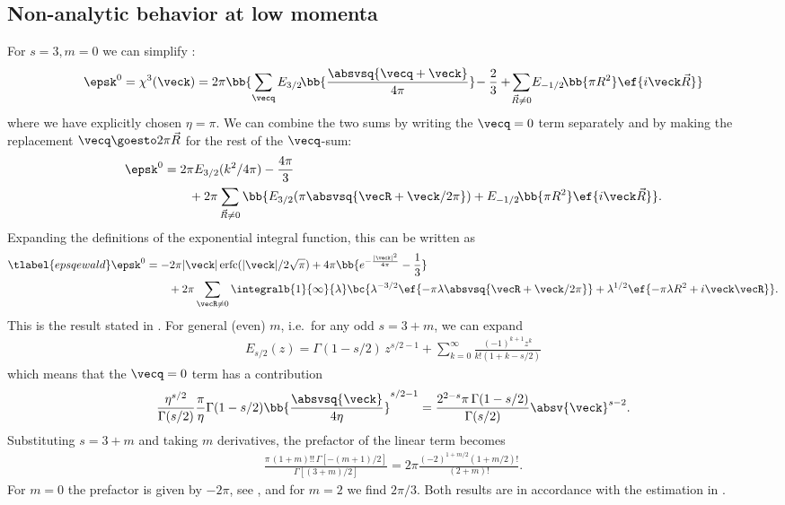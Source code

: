\subsection{Non-analytic behavior at low momenta}
For $s=3, m=0$ we can simplify :
\begin{align}
    \epsk^0 = \chi^3(\veck) = 2\pi \bb{ \sum_{\vecq} E_{3/2}\!\bb{\frac{\absvsq{\vecq+\veck}}{4\pi}}\! - \frac{2}{3} + \!\sum_{\vec{R}\ne 0}\! E_{-1/2}\!\bb{\pi R^2} \ef{i \veck \vec{R}} }
\end{align}
where we have explicitly chosen $\eta = \pi$. We can combine the two sums by writing the $\vecq=0$ term separately and by making the replacement $\vecq \goesto 2\pi\vec{R}$ for the rest of the $\vecq$-sum:
\begin{align}
    \epsk^0 &= 2\pi  E_{3/2}(k^2/4\pi) - \frac{4\pi}{3}\\
                 &\qquad+ 2\pi\sum_{\vec{R}\ne 0} \bb{ E_{3/2}( \pi \absvsq{\vecR+\veck/2\pi} ) + E_{-1/2}\!\bb{\pi R^2} \ef{i \veck \vec{R}} }.
\end{align}
Expanding the definitions of the exponential integral function, this can be written as
\begin{align} \tlabel{epsqewald}
    \epsk^0 &= -2 \pi  |\veck| \operatorname{erfc}( |\veck|/2 \sqrt{\pi} ) + 4 \pi \bb{ e^{-\frac{|\veck|^2}{4 \pi }}-\frac{1 }{3} } \\
            &\qquad+ 2\pi \sum_{\vecR\ne 0} \integralb{1}{\infty}{\lambda} \bc{ \lambda^{-3/2} \ef{-\pi\lambda\absvsq{\vecR+\veck/2\pi}} + \lambda^{1/2} \ef{-\pi \lambda R^2+ i\veck \vecR} }.
\end{align}
This is the result stated in .
For general (even) $m$, i.e.~for any odd $s=3+m$, we can expand
\begin{align}
    E_{s/2}(z) = \Gamma(1-s/2)\, z^{s/2-1} + \sum_{k=0}^\infty \frac{(-1)^{k+1} z^k}{k! (1+k-s/2)}
\end{align}
which means that the $\vecq=0$ term has a contribution
\begin{align}
\frac{\eta^{s/2}}{\Gamma(s/2)} \frac{\pi}{\eta} \Gamma(1-s/2) \bb{\frac{\absvsq{\veck}}{4\eta}}^{s/2-1} = \frac{2^{2-s}\pi\, \Gamma(1-s/2)}{\Gamma(s/2)} \absv{\veck}^{s-2}.
\end{align}
Substituting $s=3+m$ and taking $m$ derivatives, the prefactor of the linear term becomes
\begin{align}
    \frac{\pi\, (1+m)!! \,\Gamma[-(m+1)/2]}{\Gamma[(3+m)/2]} = 2\pi \frac{(-2)^{1+m/2} (1+m/2)!}{(2+m)!}.
\end{align}
For $m=0$ the prefactor is given by $-2\pi$, see , and for $m=2$ we find $2\pi/3$. Both results are in accordance with the estimation in .
